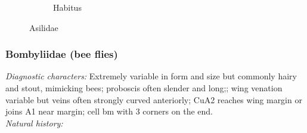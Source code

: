\documentclass[letterpaper, 11pt]{article}
\begin{document}
\begin{figure}[ht!]
\begin{subfigure}[ht!]{0.45\textwidth}
        \caption{Habitus \citep[][Fig. 42.1]{mcalpine1981manual}}
        \label{fig:asilid1}
    \end{subfigure}
    \caption{Asilidae}\label{fig:asilids}
\end{figure}

\subsubsection{Bombyliidae (bee flies)}
\noindent{}\textit{Diagnostic characters:} Extremely variable in form and size but commonly hairy and stout, mimicking bees; proboscis often slender and long;; wing venation variable but veins often strongly curved anteriorly; CuA2 reaches wing margin or joins A1 near margin; cell bm with 3 corners on the end.\\

\noindent{}\textit{Natural history:} \\
\end{document}
